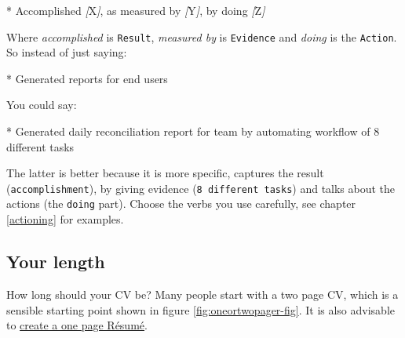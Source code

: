 \documentclass[
]{book}
\newenvironment{Shaded}{\begin{snugshade}}{\end{snugshade}}
\newcommand{\CommentTok}[1]{\textcolor[rgb]{0.56,0.35,0.01}{\textit{#1}}}
\newcommand{\NormalTok}[1]{#1}
\newcommand{\OtherTok}[1]{\textcolor[rgb]{0.56,0.35,0.01}{#1}}
\newcommand{\SpecialStringTok}[1]{\textcolor[rgb]{0.31,0.60,0.02}{#1}}
\begin{document}
\begin{Shaded}
\begin{Highlighting}[]
\SpecialStringTok{* }\NormalTok{Accomplished }\CommentTok{[}\OtherTok{X}\CommentTok{]}\NormalTok{, as measured by }\CommentTok{[}\OtherTok{Y}\CommentTok{]}\NormalTok{, by doing }\CommentTok{[}\OtherTok{Z}\CommentTok{]}
\end{Highlighting}
\end{Shaded}

Where \emph{accomplished} is \texttt{Result}, \emph{measured by} is \texttt{Evidence} and \emph{doing} is the \texttt{Action}. So instead of just saying:

\begin{Shaded}
\begin{Highlighting}[]
\SpecialStringTok{* }\NormalTok{Generated reports for end users}
\end{Highlighting}
\end{Shaded}

You could say:

\begin{Shaded}
\begin{Highlighting}[]
\SpecialStringTok{* }\NormalTok{Generated daily reconciliation report for team by automating workflow of 8 different tasks}
\end{Highlighting}
\end{Shaded}

The latter is better because it is more specific, captures the result (\texttt{accomplishment}), by giving evidence (\texttt{8\ different\ tasks}) and talks about the actions (the \texttt{doing} part). Choose the verbs you use carefully, see chapter \ref{actioning} for examples.

\hypertarget{length}{%
\subsection{Your length}\label{length}}

How long should your CV be? Many people start with a two page CV, which is a sensible starting point shown in figure \ref{fig:oneortwopager-fig}. It is also advisable to \href{https://www.cv-library.co.uk/career-advice/cv/how-long-cv-be/}{create a one page Résumé}. \citep{howlong}
\end{document}
